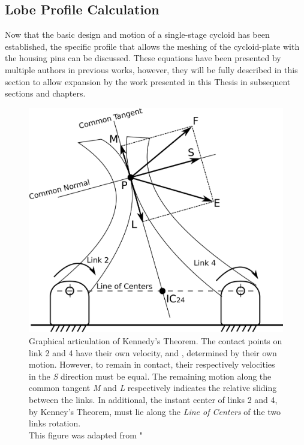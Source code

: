 \subsection{Lobe Profile Calculation} \label{ch:design:basic_calc:profile}

Now that the basic design and motion of a single-stage cycloid has been established, the specific profile that allows the meshing of the cycloid-plate with the housing pins can be discussed. These equations have been presented by multiple authors in previous works, however, they will be fully described in this section to allow expansion by the work presented in this Thesis in subsequent sections and chapters. 

\begin{figure}[h]
   \centering
   \includegraphics[width=0.60\linewidth]{fig/kennedy_sliding}
   \caption{Graphical articulation of Kennedy's Theorem. The contact points on link 2 and 4 have their own velocity,  and , determined by their own motion. However, to remain in contact, their respectively velocities in the \textit{S} direction must be equal. The remaining motion along the common tangent \textit{M} and \textit{L} respectively indicates the relative sliding between the links. In additional, the instant center of links 2 and 4, by Kenney's Theorem, must lie along the \textit{Line of Centers} of the two links rotation. \\This figure was adapted from \cite{ref:kinematics_and_dynamics}"}
   \label{fig:kennedy_sliding}
\end{figure}

